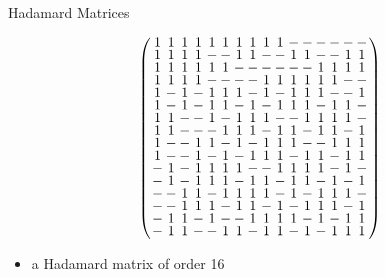 \documentclass{beamer}
\begin{document}
\begin{frame}{Hadamard Matrices}

  \[
    \arraycolsep=1.0pt\def\arraystretch{0.75}
    \left(\begin{array}{cccccccccccccccc}
            1&1&1&1&1&1&1&1&1&1&-&-&-&-&-&-\\
            1&1&1&1&-&-&1&1&-&-&1&1&-&-&1&1\\
            1&1&1&1&1&1&-&-&-&-&-&-&1&1&1&1\\
            1&1&1&1&-&-&-&-&1&1&1&1&1&1&-&-\\
            1&-&1&-&1&1&1&-&1&-&1&1&1&-&-&1\\
            1&-&1&-&1&1&-&1&-&1&1&1&-&1&1&-\\
            1&1&-&-&1&-&1&1&1&-&-&1&1&1&1&-\\
            1&1&-&-&-&1&1&1&-&1&1&-&1&1&-&1\\
            1&-&-&1&1&-&1&-&1&1&1&-&-&1&1&1\\
            1&-&-&1&-&1&-&1&1&1&-&1&1&-&1&1\\
            -&1&-&1&1&1&1&-&-&1&1&1&1&-&1&-\\
            -&1&-&1&1&1&-&1&1&-&1&1&-&1&-&1\\
            -&-&1&1&-&1&1&1&1&-&1&-&1&1&1&-\\
            -&-&1&1&1&-&1&1&-&1&-&1&1&1&-&1\\
            -&1&1&-&1&-&-&1&1&1&1&-&1&-&1&1\\
            -&1&1&-&-&1&1&-&1&1&-&1&-&1&1&1\\
          \end{array}\right)
      \]

      \begin{itemize}
      \item a Hadamard matrix of order 16
      \end{itemize}

\end{frame}
\end{document}
